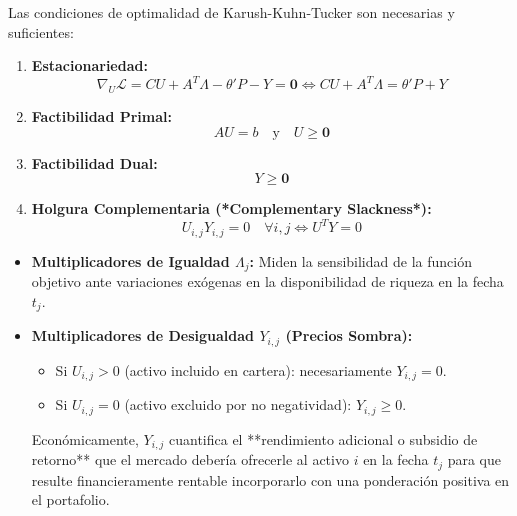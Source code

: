 \documentclass[11pt,a4paper]{report}
\numberwithin{equation}{chapter}
\begin{document}
Las condiciones de optimalidad de Karush-Kuhn-Tucker son necesarias y suficientes:
\begin{enumerate}
    \item \textbf{Estacionariedad:}
    \begin{equation}
        \nabla_U \mathcal{L} = CU + A^T \Lambda - \theta' P - Y = \mathbf{0} \iff \boxed{CU + A^T \Lambda = \theta' P + Y}
    \end{equation}
    \item \textbf{Factibilidad Primal:}
    \begin{equation}
        \boxed{AU = b \quad \text{y} \quad U \ge \mathbf{0}}
    \end{equation}
    \item \textbf{Factibilidad Dual:}
    \begin{equation}
        \boxed{Y \ge \mathbf{0}}
    \end{equation}
    \item \textbf{Holgura Complementaria (*Complementary Slackness*):}
    \begin{equation}
        \boxed{U_{i,j} Y_{i,j} = 0 \quad \forall i, j \iff U^T Y = 0}
    \end{equation}
\end{enumerate}

\begin{conceptbox}
\begin{itemize}[leftmargin=1.5em]
    \item \textbf{Multiplicadores de Igualdad $\Lambda_j$:} Miden la sensibilidad de la función objetivo ante variaciones exógenas en la disponibilidad de riqueza en la fecha $t_j$.
    \item \textbf{Multiplicadores de Desigualdad $Y_{i,j}$ (Precios Sombra):}
    \begin{itemize}
        \item Si $U_{i,j} > 0$ (activo incluido en cartera): necesariamente $Y_{i,j} = 0$.
        \item Si $U_{i,j} = 0$ (activo excluido por no negatividad): $Y_{i,j} \ge 0$. 
    \end{itemize}
    Económicamente, $Y_{i,j}$ cuantifica el **rendimiento adicional o subsidio de retorno** que el mercado debería ofrecerle al activo $i$ en la fecha $t_j$ para que resulte financieramente rentable incorporarlo con una ponderación positiva en el portafolio.
\end{itemize}
\end{conceptbox}
\end{document}
